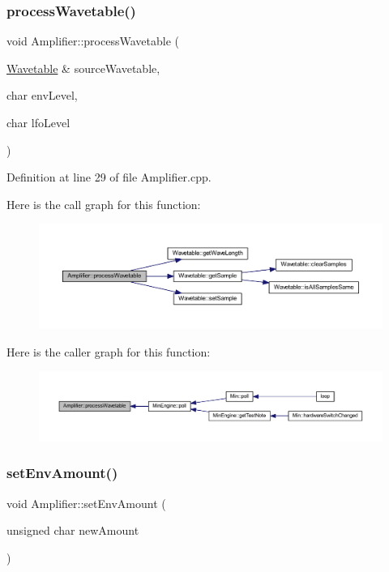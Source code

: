 \subsubsection{\texorpdfstring{process\+Wavetable()}{processWavetable()}}
{\footnotesize\ttfamily void Amplifier\+::process\+Wavetable (\begin{DoxyParamCaption}\item[{\hyperlink{class_wavetable}{Wavetable} \&}]{source\+Wavetable,  }\item[{char}]{env\+Level,  }\item[{char}]{lfo\+Level }\end{DoxyParamCaption})}



Definition at line 29 of file Amplifier.\+cpp.

Here is the call graph for this function\+:
\nopagebreak
\begin{figure}[H]
\begin{center}
\leavevmode
\includegraphics[width=350pt]{class_amplifier_a3f1ec0c50fdb0adb71e2f7576e38170a_cgraph}
\end{center}
\end{figure}
Here is the caller graph for this function\+:
\nopagebreak
\begin{figure}[H]
\begin{center}
\leavevmode
\includegraphics[width=350pt]{class_amplifier_a3f1ec0c50fdb0adb71e2f7576e38170a_icgraph}
\end{center}
\end{figure}
\mbox{\label{class_amplifier_a1106605e158c9855d4e303e6972baf9f}} 
\subsubsection{\texorpdfstring{set\+Env\+Amount()}{setEnvAmount()}}
{\footnotesize\ttfamily void Amplifier\+::set\+Env\+Amount (\begin{DoxyParamCaption}\item[{unsigned char}]{new\+Amount }\end{DoxyParamCaption})\hspace{0.3cm}{\ttfamily [inline]}}



